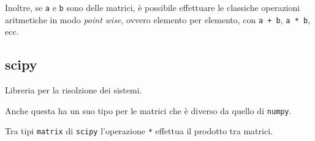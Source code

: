 Inoltre, se \texttt{a} e \texttt{b} sono delle matrici, è possibile effettuare le classiche operazioni aritmetiche in modo \textit{point wise}, ovvero elemento per elemento, con \texttt{a + b}, \texttt{a * b}, ecc.

\subsection{scipy}\label{scipy}

Libreria per la risolzione dei sistemi.

Anche questa ha un suo tipo per le matrici che è diverso da quello di
\texttt{numpy}.

Tra tipi \texttt{matrix} di \texttt{scipy} l'operazione \texttt{*} effettua il prodotto tra matrici.
